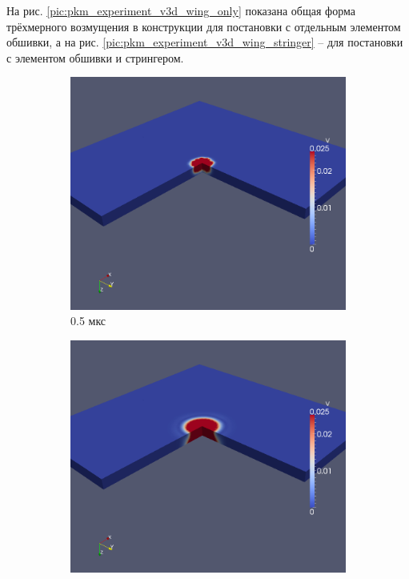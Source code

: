 На рис. \ref{pic:pkm_experiment_v3d_wing_only} показана общая форма трёхмерного возмущения в конструкции для постановки с отдельным элементом обшивки, а на рис. \ref{pic:pkm_experiment_v3d_wing_stringer} -- для постановки с элементом обшивки и стрингером.

\begin{figure}[htp]
\begin{subfigure}[b]{0.5\textwidth}
\centering
\includegraphics[width=\textwidth]{png/pkm-experiment/wing-only/wave-3d/v-0001.png}
\caption{0.5 мкс}
\end{subfigure}
\begin{subfigure}[b]{0.5\textwidth}
\centering
\includegraphics[width=\textwidth]{png/pkm-experiment/wing-only/wave-3d/v-0005.png}

\end{subfigure}
\end{figure}
